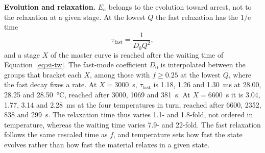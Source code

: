 \documentclass[11pt]{article}
\begin{document}
\textbf{Evolution and relaxation.} $E_a$ belongs to the evolution toward arrest, not to the relaxation at a given stage. At the lowest $Q$ the fast relaxation has the $1/\mathrm{e}$ time
\begin{equation}
 \tau_\mathrm{fast}=\frac{1}{D_0Q^2},
 \label{eq:si-taufast}
\end{equation}
and a stage $X$ of the master curve is reached after the waiting time of Equation~\ref{eq:si-tw}. The fast-mode coefficient $D_0$ is interpolated between the groups that bracket each $X$, among those with $f\geq0.25$ at the lowest $Q$, where the fast decay fixes a rate. At $X=3000$~s, $\tau_\mathrm{fast}$ is 1.18, 1.26 and 1.30~ms at 28.00, 28.25 and \SI{28.50}{\degreeCelsius}, reached after 3000, 1069 and \SI{381}{\second}. At $X=6600$~s it is 3.04, 1.77, 3.14 and 2.28~ms at the four temperatures in turn, reached after 6600, 2352, 838 and \SI{299}{\second}. The relaxation time thus varies 1.1- and 1.8-fold, not ordered in temperature, whereas the waiting time varies 7.9- and 22-fold. The fast relaxation follows the same rescaled time as $f$, and temperature sets how fast the state evolves rather than how fast the material relaxes in a given state.
\end{document}
